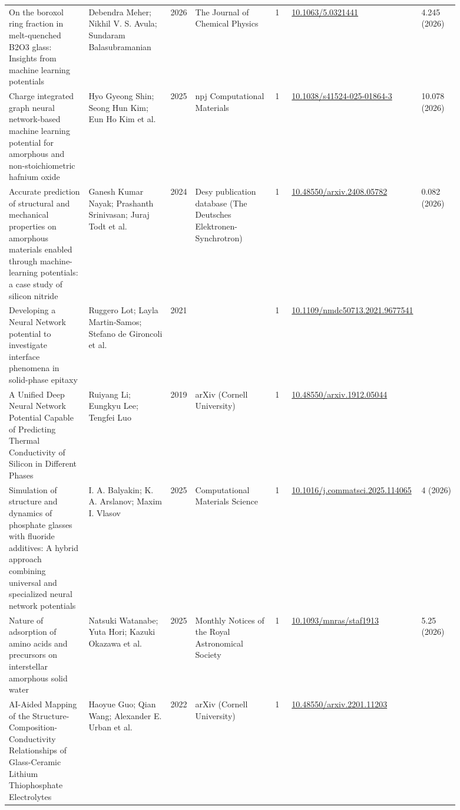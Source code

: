 \documentclass[10pt,a4paper]{article}
\begin{document}
{\begin{longtable}{p{0.192\linewidth}p{0.192\linewidth}p{0.043\linewidth}p{0.192\linewidth}p{0.043\linewidth}p{0.132\linewidth}p{0.096\linewidth}}
On the boroxol ring fraction in melt-quenched B2O3 glass: Insights from machine learning potentials & Debendra Meher; Nikhil V. S. Avula; Sundaram Balasubramanian & 2026 & The Journal of Chemical Physics & 1 & \href{https://doi.org/10.1063/5.0321441}{10.1063/5.0321441} & 4.245 (2026) \\
Charge integrated graph neural network-based machine learning potential for amorphous and non-stoichiometric hafnium oxide & Hyo Gyeong Shin; Seong Hun Kim; Eun Ho Kim et al. & 2025 & npj Computational Materials & 1 & \href{https://doi.org/10.1038/s41524-025-01864-3}{10.1038/s41524-025-01864-3} & 10.078 (2026) \\
Accurate prediction of structural and mechanical properties on amorphous materials enabled through machine-learning potentials: a case study of silicon nitride & Ganesh Kumar Nayak; Prashanth Srinivasan; Juraj Todt et al. & 2024 & Desy publication database (The Deutsches Elektronen-Synchrotron) & 1 & \href{https://doi.org/10.48550/arxiv.2408.05782}{10.48550/arxiv.2408.05782} & 0.082 (2026) \\
Developing a Neural Network potential to investigate interface phenomena in solid-phase epitaxy & Ruggero Lot; Layla Martin‐Samos; Stefano de Gironcoli et al. & 2021 &  & 1 & \href{https://doi.org/10.1109/nmdc50713.2021.9677541}{10.1109/nmdc50713.2021.9677541} &  \\
A Unified Deep Neural Network Potential Capable of Predicting Thermal Conductivity of Silicon in Different Phases & Ruiyang Li; Eungkyu Lee; Tengfei Luo & 2019 & arXiv (Cornell University) & 1 & \href{https://doi.org/10.48550/arxiv.1912.05044}{10.48550/arxiv.1912.05044} &  \\
Simulation of structure and dynamics of phosphate glasses with fluoride additives: A hybrid approach combining universal and specialized neural network potentials & I. A. Balyakin; K. A. Arslanov; Maxim I. Vlasov & 2025 & Computational Materials Science & 1 & \href{https://doi.org/10.1016/j.commatsci.2025.114065}{10.1016/j.commatsci.2025.114065} & 4 (2026) \\
Nature of adsorption of amino acids and precursors on interstellar amorphous solid water & Natsuki Watanabe; Yuta Hori; Kazuki Okazawa et al. & 2025 & Monthly Notices of the Royal Astronomical Society & 1 & \href{https://doi.org/10.1093/mnras/staf1913}{10.1093/mnras/staf1913} & 5.25 (2026) \\
AI-Aided Mapping of the Structure-Composition-Conductivity Relationships of Glass-Ceramic Lithium Thiophosphate Electrolytes & Haoyue Guo; Qian Wang; Alexander E. Urban et al. & 2022 & arXiv (Cornell University) & 1 & \href{https://doi.org/10.48550/arxiv.2201.11203}{10.48550/arxiv.2201.11203} &  \\

\end{longtable}}
\end{document}
